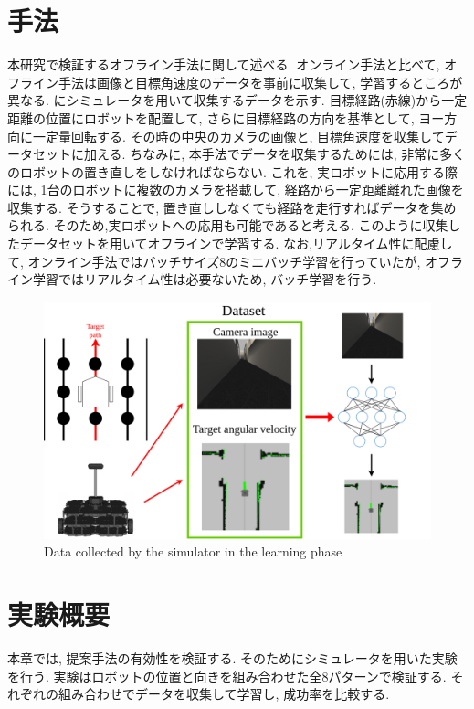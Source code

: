 
\section{手法}
本研究で検証するオフライン手法に関して述べる. オンライン手法と比べて, オフライン手法は画像と目標角速度のデータを事前に収集して, 学習するところが異なる. にシミュレータを用いて収集するデータを示す. 目標経路(赤線)から一定距離の位置にロボットを配置して, さらに目標経路の方向を基準として, ヨー方向に一定量回転する. その時の中央のカメラの画像と, 目標角速度を収集してデータセットに加える. ちなみに, 本手法でデータを収集するためには, 非常に多くのロボットの置き直しをしなければならない. これを, 実ロボットに応用する際には, 1台のロボットに複数のカメラを搭載して, 経路から一定距離離れた画像を収集する. そうすることで, 置き直ししなくても経路を走行すればデータを集められる. そのため,実ロボットへの応用も可能であると考える. このように収集したデータセットを用いてオフラインで学習する. なお,リアルタイム性に配慮して, オンライン手法ではバッチサイズ8のミニバッチ学習を行っていたが, オフライン学習ではリアルタイム性は必要ないため, バッチ学習を行う. 

\newpage
  \begin{figure}[h]
  \centering
  \includegraphics[keepaspectratio, scale=0.3]{images/offline.png}
  \caption{Data collected by the simulator in the learning phase}
  \label{Fig:collect-data2}
  \end{figure}

\section{実験概要}
本章では, 提案手法の有効性を検証する. そのためにシミュレータを用いた実験を行う. 実験はロボットの位置と向きを組み合わせた全8パターンで検証する. それぞれの組み合わせでデータを収集して学習し, 成功率を比較する. 

